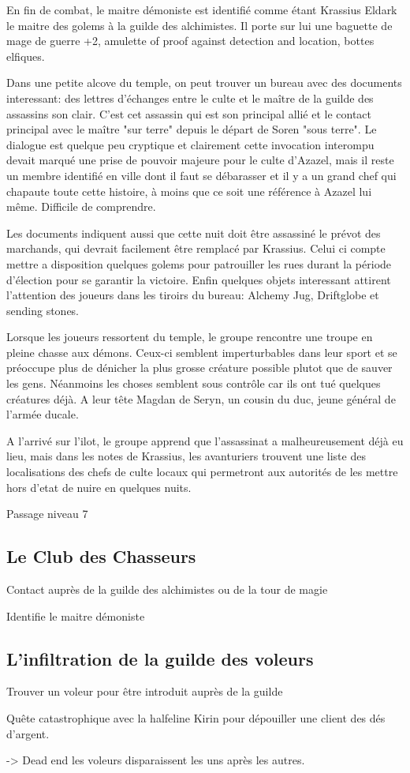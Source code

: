En fin de combat, le maitre démoniste est identifié comme étant Krassius Eldark
le maitre des golems à la guilde des alchimistes. Il porte sur lui une baguette
de mage de guerre +2, amulette of proof against detection and location, bottes
elfiques.

Dans une petite alcove du temple, on peut trouver un bureau avec des documents 
interessant: des lettres d'échanges entre le culte et le maître de la guilde
des assassins
son clair. C'est cet assassin qui est son principal allié 
et le contact principal avec le maître "sur terre" depuis le départ de Soren  
"sous terre". Le dialogue est quelque peu cryptique et clairement cette invocation
interompu devait marqué une prise de pouvoir majeure pour le culte d'Azazel, mais
il reste un membre identifié en ville dont il faut se débarasser et il y a
un grand chef qui chapaute toute cette histoire, à moins que ce soit une référence 
à Azazel lui même. Difficile de comprendre.

Les documents indiquent aussi que cette nuit doit être assassiné le prévot des 
marchands, qui devrait facilement être remplacé par Krassius. Celui ci compte
mettre a disposition quelques golems pour patrouiller les rues durant la période
d'élection pour se garantir la victoire.
Enfin quelques objets interessant attirent l'attention des joueurs dans les tiroirs
du bureau: Alchemy Jug, Driftglobe et sending stones.

Lorsque les joueurs ressortent du temple, le groupe rencontre une troupe
en pleine chasse aux démons. Ceux-ci semblent imperturbables dans leur sport et 
se préoccupe plus de dénicher la plus grosse créature possible plutot que de
sauver les gens. Néanmoins les choses semblent sous contrôle car ils ont tué quelques
créatures déjà. A leur tête Magdan de Seryn, un cousin du duc, jeune général de l'armée
ducale.

A l'arrivé sur l'ilot, le groupe apprend que l'assassinat a malheureusement déjà eu 
lieu, mais dans les notes de Krassius, les avanturiers trouvent une liste
des localisations des chefs de culte locaux qui permetront aux autorités de les mettre
hors d'etat de nuire en quelques nuits.

Passage niveau 7


\subsection*{Le Club des Chasseurs}

Contact auprès de la guilde des alchimistes ou de la tour de magie


Identifie le maitre démoniste

\subsection*{L'infiltration de la guilde des voleurs}

Trouver un voleur pour être introduit auprès de la guilde

Quête catastrophique avec la halfeline Kirin pour dépouiller une client des dés d'argent.

-> Dead end les voleurs disparaissent les uns après les autres.


